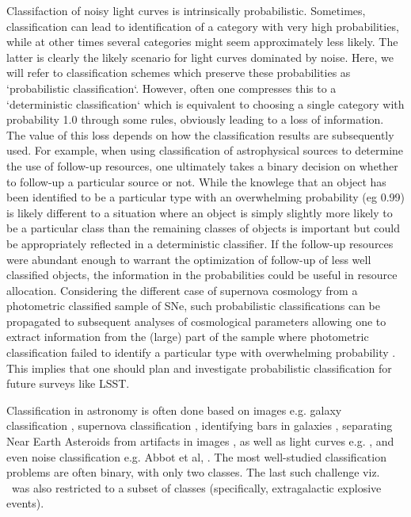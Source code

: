 Classifaction of noisy light curves is intrinsically probabilistic.
Sometimes, classification can lead to identification of a category with very high probabilities, while at other times several categories might seem approximately less likely. The latter is clearly the likely scenario for light curves dominated by noise.
Here, we will refer to classification schemes which preserve these probabilities as `probabilistic classification`.
However, often one compresses this to a `deterministic classification` which is equivalent to choosing a single category with probability 1.0 through some rules, obviously leading to a loss of information.
The value of this loss depends on how the classification results are subsequently used.
For example, when using classification of astrophysical sources to determine the use of follow-up resources, one ultimately takes a binary decision on whether to follow-up a particular source or not.
While the knowlege that an object has been identified to be a particular type with an overwhelming probability (eg 0.99) is likely different to a situation where an object is simply slightly more likely to be a particular class than the remaining classes of objects is important but could be appropriately reflected in a deterministic classifier.
If the follow-up resources were abundant enough to warrant the optimization of follow-up of less well classified objects, the information in the probabilities could be useful in resource allocation.
Considering the different case of supernova cosmology from a photometric classified sample of SNe, such probabilistic classifications can be propagated to subsequent analyses of cosmological parameters allowing one to extract information from the (large) part of the sample where photometric classification failed to identify a particular type with overwhelming probability \cite{roberts_zbeams:_2017}.
This implies that one should plan and investigate probabilistic classification for future surveys like LSST.

Classification in astronomy is often done based on images e.g. galaxy classification \citep{2016A&C....16...34H}, supernova classification \citep{2017ApJ...836...97C}, identifying bars in galaxies \citep{2018MNRAS.477..894A}, separating Near Earth Asteroids from artifacts in images \citep{2016PASJ...68..104M}, as well as light curves e.g. \citet{2016PASJ...68..104M, 2017arXiv170906257M, 2017CQGra..34f4003Z}, and even noise classification e.g. Abbot et al, \citet{2017CQGra..34f4003Z, 2018PhRvD..97j1501G}.
The most well-studied classification problems are often binary, with only two classes.
The last such challenge viz. \snphotcc\ was also restricted to a subset of classes (specifically, extragalactic explosive events).

